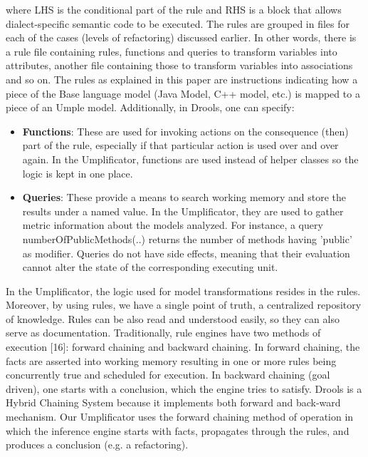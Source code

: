 where LHS is the conditional part of the rule and RHS is a block that allows dialect-specific semantic code to be executed. 
The rules are grouped in files for each of the cases (levels of refactoring) discussed earlier. In other words, there is a rule file containing rules, functions and queries to transform variables into attributes, another file containing those to transform variables into associations and so on. 
The rules as explained in this paper are instructions indicating how a piece of the Base language model (Java Model, C++ model, etc.) is mapped to a piece of an Umple model. Additionally, in Drools, one can specify:
\begin{itemize}
\item \textbf{Functions}: These are used for invoking actions on the consequence (then) part of the rule, especially if that particular action is used over and over again. In the Umplificator, functions are used instead of helper classes so the logic is kept in one place.
\item \textbf{Queries}: These provide a means to search working memory and store the results under a named value. In the Umplificator, they are used to gather metric information about the models analyzed. For instance, a query numberOfPublicMethods(..) returns the number of methods having 'public' as modifier. Queries do not have side effects, meaning that their evaluation cannot alter the state of the corresponding executing unit. 
\end{itemize}

In the Umplificator, the logic used for model transformations resides in the rules. Moreover, by using rules, we have a single point of truth, a centralized repository of knowledge. Rules can be also read and understood easily, so they can also serve as documentation.
Traditionally, rule engines have two methods of execution [16]: forward chaining and backward chaining. In forward chaining, the facts are asserted into working memory resulting in one or more rules being concurrently true and scheduled for execution. In backward chaining (goal driven), one starts with a conclusion, which the engine tries to satisfy. Drools is a Hybrid Chaining System because it implements both forward and back-ward mechanism. Our Umplificator uses the forward chaining method of operation in which the inference engine starts with facts, propagates through the rules, and produces a conclusion (e.g. a refactoring).  


